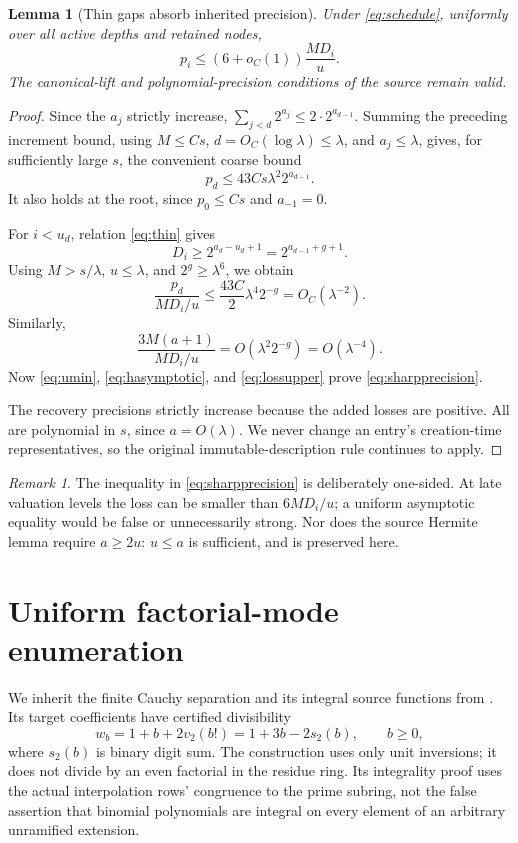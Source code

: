 \documentclass[11pt]{article}
\newtheorem{lemma}[theorem]{Lemma}
\theoremstyle{remark}\newtheorem{remark}[theorem]{Remark}
\newcommand{\vTwo}{v_2}
\begin{document}
\begin{lemma}[Thin gaps absorb inherited precision]\label{lem:precision}
Under \eqref{eq:schedule}, uniformly over all active depths and retained nodes,
\begin{equation}
 p_i\le(6+o_C(1))\frac{MD_i}{u}.\label{eq:sharpprecision}
\end{equation}
The canonical-lift and polynomial-precision conditions of the source remain valid.
\end{lemma}
\begin{proof}
Since the \(a_j\) strictly increase, \(\sum_{j<d}2^{a_j}\le2\cdot2^{a_{d-1}}\). Summing the preceding increment bound, using \(M\le Cs\), \(d=O_C(\log\lambda)\le\lambda\), and \(a_j\le\lambda\), gives, for sufficiently large \(s\), the convenient coarse bound
\begin{equation}
 p_d\le43Cs\lambda^2 2^{a_{d-1}}.\label{eq:inherited}
\end{equation}
It also holds at the root, since \(p_0\le Cs\) and \(a_{-1}=0\).

For \(i<u_d\), relation \eqref{eq:thin} gives
\[
 D_i\ge2^{a_d-u_d+1}=2^{a_{d-1}+g+1}.
\]
Using \(M>s/\lambda\), \(u\le\lambda\), and \(2^g\ge\lambda^6\), we obtain
\[
 \frac{p_d}{MD_i/u}\le\frac{43C}{2}\lambda^4 2^{-g}
 =O_C(\lambda^{-2}).
\]
Similarly,
\[
 \frac{3M(a+1)}{MD_i/u}=O(\lambda^2 2^{-g})=O(\lambda^{-4}).
\]
Now \eqref{eq:umin}, \eqref{eq:hasymptotic}, and \eqref{eq:lossupper} prove \eqref{eq:sharpprecision}.

The recovery precisions strictly increase because the added losses are positive. All are polynomial in \(s\), since \(a=O(\lambda)\). We never change an entry's creation-time representatives, so the original immutable-description rule continues to apply.
\end{proof}

\begin{remark}
The inequality in \eqref{eq:sharpprecision} is deliberately one-sided. At late valuation levels the loss can be smaller than \(6MD_i/u\); a uniform asymptotic equality would be false or unnecessarily strong. Nor does the source Hermite lemma require \(a\ge2u\): \(u\le a\) is sufficient, and is preserved here.
\end{remark}

\section{Uniform factorial-mode enumeration}
\label{sec:modes}
We inherit the finite Cauchy separation and its integral source functions from . Its target coefficients have certified divisibility
\begin{equation}
 w_b=1+b+2\vTwo(b!)=1+3b-2s_2(b),\qquad b\ge0,
 \label{eq:weights}
\end{equation}
where \(s_2(b)\) is binary digit sum. The construction uses only unit inversions; it does not divide by an even factorial in the residue ring. Its integrality proof uses the actual interpolation rows' congruence to the prime subring, not the false assertion that binomial polynomials are integral on every element of an arbitrary unramified extension.
\end{document}
